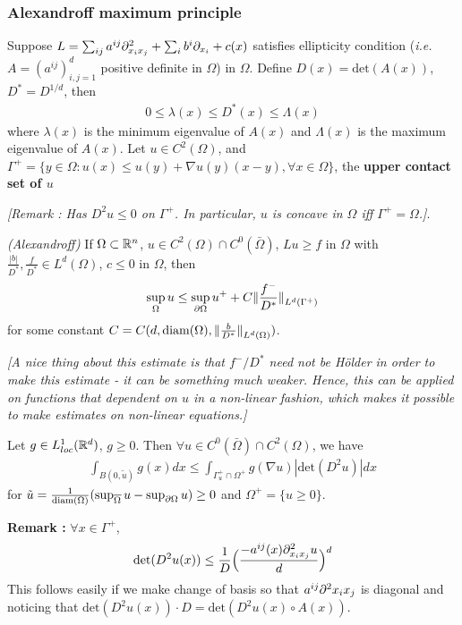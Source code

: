 \documentclass[12pt,a4paper]{article}
\begin{document}
\subsubsection*{Alexandroff maximum principle}

Suppose $L = \sum_{ij} a^{ij} \partial^2_{x_i x_j} + \sum_{i} b^i \partial_{x_i} + c(x)$ satisfies ellipticity condition (\textit{i.e.} $A = (a^{ij})_{i,j=1}^d$ positive definite in $\Omega$) in $\Omega$. Define $D(x) = \text{det}(A(x))$, $D^* = D^{1/d}$, then
\begin{align*}
0\leq \lambda(x) \leq D^*(x) \leq \Lambda(x)
\end{align*}
where $\lambda(x)$ is the minimum eigenvalue of $A(x)$ and $\Lambda(x)$ is the maximum eigenvalue of $A(x)$. Let $u\in C^2(\Omega)$, and $\Gamma^+ = \{y\in \Omega : u(x)\leq u(y) + \nabla u(y)(x-y), \forall x\in \Omega\}$, the \textbf{upper contact set of $u$}

\emph{[Remark : Has $D^2 u \leq 0$ on $\Gamma^+$. In particular, $u$ is concave in $\Omega$ iff $\Gamma^+ =\Omega$.]}.
\s

\thm \emph{(Alexandroff)} If $\Omega \subset \mathbb{R}^n$, $u\in C^2(\Omega) \cap C^0(\bar{\Omega})$, $Lu \geq f$ in $\Omega$ with $\frac{|b|}{D^*}, \frac{f}{D^*} \in L^d(\Omega)$, $c\leq 0$ in $\Omega$, then
\begin{align*}
\sup_{\Omega} u \leq \sup_{\pa \Omega} u^+ + C\snorms{\frac{f^-}{D^*}}{L^d(\Gamma^+)}
\end{align*}
for some constant $C = C(d, \text{diam}(\Omega), \snorms{\frac{b}{D^*}}{L^d(\Omega)})$.

\emph{[A nice thing about this estimate is that $f^-/D^*$ need not be H\"older in order to make this estimate - it can be something much weaker. Hence, this can be applied on functions that dependent on $u$ in a non-linear fashion, which makes it possible to make estimates on non-linear equations.]}
\s

\lem Let $g \in L^1_{loc}(\mathbb{R}^d)$, $g\geq 0$. Then $\forall u \in C^0(\bar{\Omega}) \cap C^2(\Omega)$, we have
\begin{align*}
\int_{B(0, \tilde{u})}g(x) dx \leq \int_{\Gamma_{u}^+ \cap \Omega^+} g(\nabla u) |\text{det}(D^2 u)|dx
\end{align*}
for $\tilde{u} = \frac{1}{\text{diam}(\Omega)} (\sup_{\overline{\Omega}} u - \sup_{\partial \Omega} u) \geq 0$ and $\Omega^+ = \{u\geq 0\}$.
\s

\textbf{Remark :} $\forall x\in \Gamma^+$,
\begin{align*}
\text{det}(D^2u(x))\leq \frac{1}{D} \Big( \frac{-a^{ij}(x) \partial^2_{x_i x_j}u}{d}\Big)^d
\end{align*}
This follows easily if we make change of basis so that $a^{ij}\partial^2 x_i x_j$ is diagonal and noticing that $\text{det}(D^2 u(x))\cdot D = \text{det}(D^2 u(x) \circ A(x))$.
\s
\end{document}

